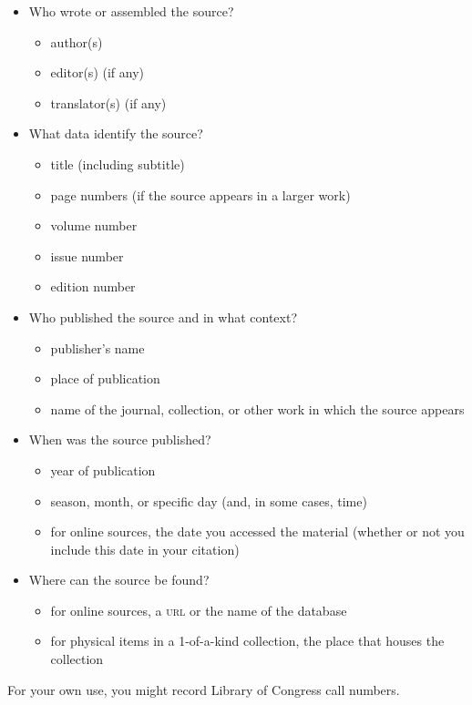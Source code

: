 \documentclass[oneside]{book}
\numberwithin{equation}{section}
\begin{document}
\begin{itemize}
    \item Who wrote or assembled the source?
    \begin{itemize}
        \item author(s)
        \item editor(s) (if any)
        \item translator(s) (if any)
    \end{itemize}
    \item What data identify the source?
    \begin{itemize}
        \item title (including subtitle)
        \item page numbers (if the source appears in a larger work)
        \item volume number
        \item issue number
        \item edition number
    \end{itemize}
    \item Who published the source and in what context?
    \begin{itemize}
        \item publisher's name
        \item place of publication
        \item name of the journal, collection, or other work in which the source appears
    \end{itemize}
    \item When was the source published?
    \begin{itemize}
        \item year of publication
        \item season, month, or specific day (and, in some cases, time)
        \item for online sources, the date you accessed the material (whether or not you include this date in your citation)
    \end{itemize}
    \item Where can the source be found?
    \begin{itemize}
        \item for online sources, a \textsc{url} or the name of the database
        \item for physical items in a 1-of-a-kind collection, the place that houses the collection
    \end{itemize}
\end{itemize}
For your own use, you might record Library of Congress call numbers.
\end{document}
